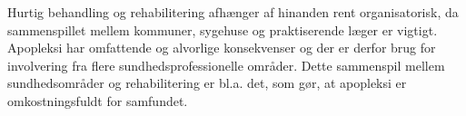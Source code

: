 Hurtig behandling og rehabilitering afhænger af hinanden rent organisatorisk, da sammenspillet mellem kommuner, sygehuse og praktiserende læger er vigtigt. Apopleksi har omfattende og alvorlige konsekvenser og der er derfor brug for involvering fra flere sundhedsprofessionelle områder.\cite{Sundhedsstyrelsen2010} Dette sammenspil mellem sundhedsområder og rehabilitering er bl.a. det, som gør, at apopleksi er omkostningsfuldt for samfundet.\cite{Sundhedsstyrelsen2010} \\
